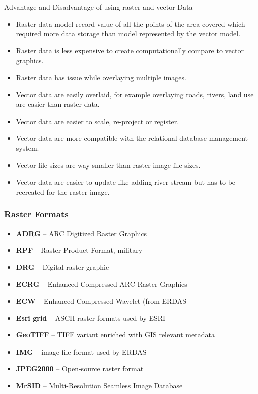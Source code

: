 \documentclass[12pt, letter]{article}
\begin{document}
Advantage and Disadvantage of using raster and vector Data

\begin{itemize}

 \item Raster data model record value of all the points of the area covered which required more data storage than model represented by the vector model.
 \item Raster data is less expensive to create computationally compare to vector graphics.
 \item Raster data has issue while overlaying multiple images.
 \item Vector data are easily overlaid, for example overlaying roads, rivers, land use are easier than raster data.
 \item Vector data are easier to scale, re-project or register.
 \item Vector data are more compatible with the relational database management system.
 \item Vector file sizes are way smaller than raster image file sizes.
 \item Vector data are easier to update like adding river stream but has to be recreated for the raster image.
\end{itemize}

\subsubsection{Raster Formats}

\begin{itemize}

 \item \textbf{ADRG} – ARC Digitized Raster Graphics
 \item \textbf{RPF} – Raster Product Format, military
 \item \textbf{DRG} – Digital raster graphic
 \item \textbf{ECRG} – Enhanced Compressed ARC Raster Graphics
 \item \textbf{ECW} – Enhanced Compressed Wavelet (from ERDAS
 \item \textbf{Esri grid} – ASCII raster formats used by ESRI
 \item \textbf{GeoTIFF} – TIFF variant enriched with GIS relevant metadata
 \item \textbf{IMG} – image file format used by ERDAS
 \item \textbf{JPEG2000} – Open-source raster format
 \item \textbf{MrSID} – Multi-Resolution Seamless Image Database
\end{itemize}
\end{document}
